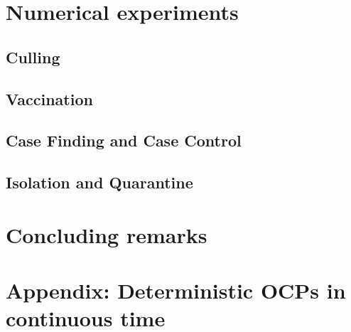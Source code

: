 \documentclass[titlepage]{amsart}
\begin{document}
  \section{Numerical experiments}
    \subsection{Culling}
      
    \subsection{Vaccination}
      
    \subsection{Case Finding and Case Control}
      
    \subsection{Isolation and Quarantine}
      
%
%
%
  \section{Concluding remarks}
   
  \section{Appendix: Deterministic OCPs in continuous time}
    
%
%
  
  
\end{document}
